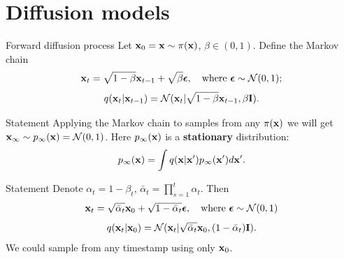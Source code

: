 \section{Diffusion models}
\begin{frame}{Forward diffusion process}
	Let $\mathbf{x}_0 = \mathbf{x} \sim \pi(\mathbf{x})$, $\beta \in (0, 1)$. Define the Markov chain
	\[
		\mathbf{x}_t = \sqrt{1 - \beta} \mathbf{x}_{t - 1} + \sqrt{\beta} \boldsymbol{\epsilon}, \quad \text{where }\boldsymbol{\epsilon} \sim \mathcal{N}(0, 1);
	\]
	\[
		q(\mathbf{x}_t | \mathbf{x}_{t-1}) = \mathcal{N}(\mathbf{x}_t | \sqrt{1 - \beta} \mathbf{x}_{t-1}, \beta \mathbf{I}).
	\]
	\vspace{-0.5cm}
	\begin{block}{Statement}
		Applying the Markov chain to samples from any $\pi(\mathbf{x})$ we will get $\mathbf{x}_{\infty} \sim p_{\infty}(\mathbf{x}) = \mathcal{N}(0, 1)$. Here $p_{\infty}(\mathbf{x})$ is a \textbf{stationary} distribution:
		\vspace{-0.2cm}
		\[
			p_{\infty}(\mathbf{x}) = \int q(\mathbf{x} | \mathbf{x}') p_{\infty}(\mathbf{x}') d \mathbf{x}'. 
		\]
		\vspace{-0.8cm}
	\end{block}
	\begin{block}{Statement}
		Denote $\alpha_t = 1 - \beta_t$, $\bar{\alpha}_t = \prod_{s=1}^t \alpha_t$. Then 
		\vspace{-0.2cm}
		\[
			\mathbf{x}_t = \sqrt{\bar{\alpha}_t} \mathbf{x}_{0} + \sqrt{1 - \bar{\alpha}_t} \boldsymbol{\epsilon}, \quad \text{where } \boldsymbol{\epsilon} \sim \mathcal{N}(0, 1)
		\]
		\[
			q(\mathbf{x}_t | \mathbf{x}_0) = \mathcal{N}(\mathbf{x}_t | \sqrt{\bar{\alpha}_t} \mathbf{x}_0, (1 - \bar{\alpha}_t) \mathbf{I}).
		\]
		We could sample from any timestamp using only $\mathbf{x}_0$.
	\end{block}
\end{frame}
